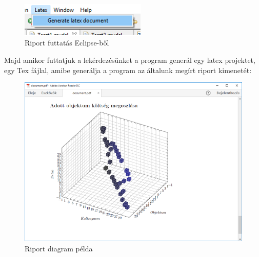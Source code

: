\begin{figure}[!ht]
\centering
\includegraphics[width=60mm, keepaspectratio]{figures/run.png}
\caption{Riport futtatás Eclipse-ből} 
\label{fig:Overview}
\end{figure}

\newpage
Majd amikor futtatjuk a lekérdezésünket a program generál egy latex projektet, egy Tex fájlal, amibe generálja a program az általunk megírt riport kimenetét:

 \begin{figure}[!ht]
\centering
\includegraphics[width=120mm, keepaspectratio]{figures/Report.png}
\caption{Riport diagram példa} 
\label{fig:Overview}
\end{figure}





